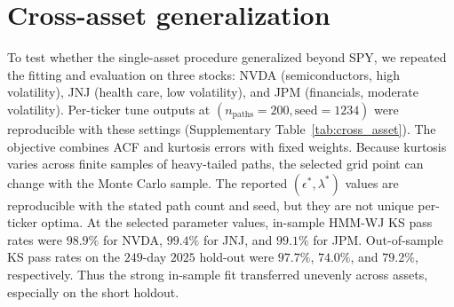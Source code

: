 \section{Cross-asset generalization}
\label{sec:supp-cross-asset}

To test whether the single-asset procedure generalized beyond SPY, we
repeated the fitting and evaluation on three stocks: NVDA
(semiconductors, high volatility), JNJ (health care, low
volatility), and JPM (financials, moderate volatility). Per-ticker
tune outputs at $(n_{\mathrm{paths}} = 200, \mathrm{seed} = 1234)$
were reproducible with these settings (Supplementary Table~\ref{tab:cross_asset}).
The objective combines
ACF and kurtosis errors with fixed weights. Because kurtosis varies
across finite samples of heavy-tailed paths, the selected grid point
can change with the Monte Carlo sample. The reported
$(\epsilon^{*},\lambda^{*})$ values are reproducible with the stated
path count and seed, but they are not unique per-ticker optima. At the
selected parameter values, in-sample HMM-WJ KS pass rates were
$98.9\%$ for NVDA, $99.4\%$ for JNJ, and $99.1\%$ for JPM.
Out-of-sample KS pass rates on the $249$-day $2025$ hold-out were
$97.7\%$, $74.0\%$, and $79.2\%$, respectively. Thus the strong
in-sample fit transferred unevenly across assets, especially on the
short holdout.

\begin{table}[tbp]
\centering
\caption{\textbf{Cross-asset generalization of the hidden Markov model
    with jumps (HMM-WJ) across three
    single-stock tickers spanning sector and volatility regimes.}
    Per-ticker tune outputs $(\epsilon^{*}, \lambda^{*})$ at
    $n_{\mathrm{paths}} = 200$ and $\mathrm{seed} = 1234$, and the
    corresponding HMM-WJ Kolmogorov--Smirnov (KS) and Anderson--Darling
    (AD) pass rates on $1{,}000$ simulated paths at $\alpha = 0.05$
    against each ticker's in-sample (IS; $2014$--$2024$) and out-of-sample
    (OoS; $2025$) growth-rate history. Values in parentheses are binomial
    standard errors (SEs) for pass rates. The
    $(\epsilon^{*}, \lambda^{*})$ values are reported as the parameter
    values used for the IS / OoS metrics rather than as canonical
    per-ticker optima.}
\label{tab:cross_asset}
\small
{}
\end{table}

